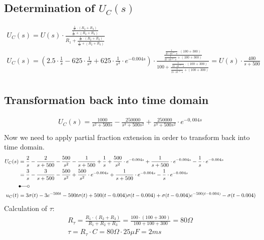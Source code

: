 \documentclass[a4paper]{article}
\begin{document}
\subsection{Determination of $U_C(s)$}
\begin{align*}
	U_C(s) = U(s) \cdot \frac{\frac{\frac{1}{sc}\cdot (R_2+R_3)}{\frac{1}{sc} + (R_2+R_3)}}{R_1 + \frac{\frac{1}{sc}\cdot (R_2+R_3)}{\frac{1}{sc} + (R_2+R_3)}}\\
	U_C(s) = \left(2.5 \cdot \frac{1}{s} - 625 \cdot \frac{1}{s^2} + 625 \cdot \frac{1}{s^2} \cdot e^{-0.004s} \right) \cdot \frac{\frac{\frac{1}{25\cdot10^{-6}\cdot s}\cdot (100+300)}{\frac{1}{25\cdot10^{-6}\cdot s} + (100+300)}}
	{100 + \frac{\frac{1}{25\cdot10^{-6}\cdot s}\cdot (100+300)}{\frac{1}{25\cdot10^{-6}\cdot s} + (100+300)}} =
	U(s) \cdot \frac{400}{s+500}\\
\end{align*}
\newpage

\subsection{Transformation back into time domain}
\begin{align*}
	U_C(s) = \frac{1000}{s^2+500s} - \frac{250000}{s^3+500s^2} + \frac{250000}{s^3+500s^2} \cdot e^{-0,004s}\\
\end{align*}
Now we need to apply partial fraction extension in order to transform back into time domain.
\begin{align*}
	U_C(s) &= \frac{2}{s} - \frac{2}{s+500} - \frac{500}{s^2} - \frac{1}{s+500} + \frac{1}{s} + \frac{500}{s^2} \cdot e^{-0.004s} + \frac{1}{s+500} \cdot e^{-0.004s} - \frac{1}{s} \cdot e^{-0.004s}\\
	&= \frac{3}{s} - \frac{3}{s+500} - \frac{500}{s^2} + \frac{500}{s^2} \cdot e^{-0.004s} + \frac{1}{s+500} \cdot e^{-0.004s} - \frac{1}{s} \cdot e^{-0.004s}\\
	&\Laplace\\
	u_C(t) &= 3\sigma(t) -3e^{-500t} - 500t\sigma(t) + 500(t-0.004)\sigma(t-0.004) + \sigma(t-0.004)e^{-500(t-0.004)} - \sigma(t-0.004)
\end{align*}
Calculation of $\tau$:
\begin{align*}
	R_\tau = \frac{R_1 \cdot (R_2 + R_3)}{R_1 + R_2 + R_3} = \frac{100 \cdot (100 + 300)}{100 + 100 + 300} = 80\Omega\\
	\tau = R_\tau \cdot C = 80\Omega \cdot 25\mu F = 2ms\\
\end{align*}
	
\end{document}
